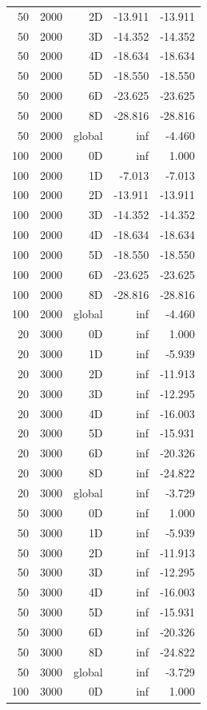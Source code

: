 \begin{longtable}{rrrrr}
50 & 2000 & 2D & -13.911 & -13.911 \\
50 & 2000 & 3D & -14.352 & -14.352 \\
50 & 2000 & 4D & -18.634 & -18.634 \\
50 & 2000 & 5D & -18.550 & -18.550 \\
50 & 2000 & 6D & -23.625 & -23.625 \\
50 & 2000 & 8D & -28.816 & -28.816 \\
50 & 2000 & global & inf & -4.460 \\
100 & 2000 & 0D & inf & 1.000 \\
100 & 2000 & 1D & -7.013 & -7.013 \\
100 & 2000 & 2D & -13.911 & -13.911 \\
100 & 2000 & 3D & -14.352 & -14.352 \\
100 & 2000 & 4D & -18.634 & -18.634 \\
100 & 2000 & 5D & -18.550 & -18.550 \\
100 & 2000 & 6D & -23.625 & -23.625 \\
100 & 2000 & 8D & -28.816 & -28.816 \\
100 & 2000 & global & inf & -4.460 \\
20 & 3000 & 0D & inf & 1.000 \\
20 & 3000 & 1D & inf & -5.939 \\
20 & 3000 & 2D & inf & -11.913 \\
20 & 3000 & 3D & inf & -12.295 \\
20 & 3000 & 4D & inf & -16.003 \\
20 & 3000 & 5D & inf & -15.931 \\
20 & 3000 & 6D & inf & -20.326 \\
20 & 3000 & 8D & inf & -24.822 \\
20 & 3000 & global & inf & -3.729 \\
50 & 3000 & 0D & inf & 1.000 \\
50 & 3000 & 1D & inf & -5.939 \\
50 & 3000 & 2D & inf & -11.913 \\
50 & 3000 & 3D & inf & -12.295 \\
50 & 3000 & 4D & inf & -16.003 \\
50 & 3000 & 5D & inf & -15.931 \\
50 & 3000 & 6D & inf & -20.326 \\
50 & 3000 & 8D & inf & -24.822 \\
50 & 3000 & global & inf & -3.729 \\
100 & 3000 & 0D & inf & 1.000 \\

\end{longtable}
